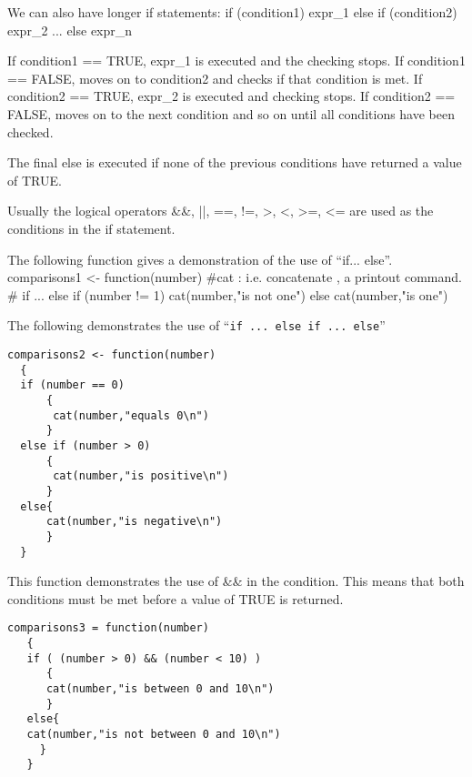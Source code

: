 We can also have longer if statements:
if (condition1)
  {expr_1}
  else if (condition2)
     {expr_2}
     ...
     else {expr_n}


If condition1 == TRUE, expr_1 is executed and the checking 
stops. If condition1 == FALSE, moves on to condition2 and checks if that condition is met. 
If condition2 == TRUE, expr_2 is executed and checking stops. If condition2 == FALSE, moves on to the next condition and so on until all conditions have been checked.

The final else is executed if none of the previous conditions have returned a value of TRUE.

Usually the logical operators &&, ||, ==, !=, >, <, >=, <= are used
as the conditions in the if statement.

The following function gives a demonstration of the use of “if... else”.
comparisons1 <- function(number)
#cat :  i.e. concatenate ,  a printout command.
   {
   # if ... else
   if (number != 1)
       {
       cat(number,"is not one\n")
       }
    else
       {
       cat(number,"is one\n")
       }
    }


The following demonstrates the use of “\texttt{if ... else if ... else}”

\begin{verbatim}
comparisons2 <- function(number)
  {
  if (number == 0)
      {
       cat(number,"equals 0\n")
      }
  else if (number > 0)
      {
       cat(number,"is positive\n")
      }
  else{
      cat(number,"is negative\n")
      }
  }
 \end{verbatim}


This function demonstrates the use of && in the condition. This means that both conditions must be met before a value of TRUE is returned.



\begin{framed}
\begin{verbatim}
comparisons3 = function(number)
   {
   if ( (number > 0) && (number < 10) )
      {
      cat(number,"is between 0 and 10\n")
      }
   else{
   cat(number,"is not between 0 and 10\n")
     }
   }
\end{verbatim}
\end{framed}


